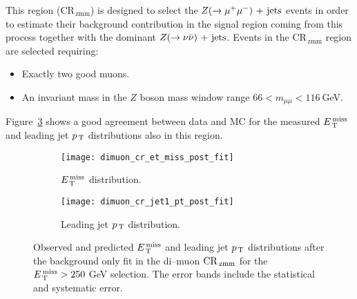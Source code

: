 This region (CR$_\mathrm{\, zmm}$) is designed to select the $Z (\rightarrow \mu^+ \mu^-)\mathrm{~+~jets}$
events in order to estimate their background contribution in the signal region
coming from this process together with the dominant $Z (\rightarrow \nu \bar{\nu})\mathrm{~+~jets}$. Events in
the CR$_\mathrm{\, zmm}$ region are selected requiring:
\begin{itemize}
\item Exactly two good muons.
\item An invariant mass in the $Z$ boson mass window range
  $66 < m_{\mu \mu} < 116~$GeV.
\end{itemize}
Figure~\ref{fig:dimuon_cr_plots} shows a good agreement between data and MC for
the measured $E_\mathrm{\, T}^\mathrm{\, miss}$ and leading jet $p_\mathrm{\, T}$ distributions also in this region.
\begin{figure}[!h]
  \centering
  \begin{subfigure}[t]{.48\linewidth}
    \texttt{[image: dimuon\_cr\_et\_miss\_post\_fit]}
    \caption{$E_\mathrm{\, T}^\mathrm{\, miss}$ distribution.}
    \label{fig:dimuon_cr_et_miss_pre_fit}
  \end{subfigure}
  \begin{subfigure}[t]{.48\linewidth}
    \texttt{[image: dimuon\_cr\_jet1\_pt\_post\_fit]}
    \caption{Leading jet $p_\mathrm{\, T}$ distribution.}
    \label{fig:dimuon_cr_jet1_pt_pre_fit}
  \end{subfigure}
  \caption{Observed and predicted $E_\mathrm{\, T}^\mathrm{\, miss}$ and leading jet $p_\mathrm{\, T}$ distributions
    after the background only fit in the di--muon $\mathrm{CR}_\mathrm{\, zmm}$ for the
    $E_\mathrm{\, T}^\mathrm{\, miss} > 250~$GeV selection. The error bands include the statistical and
    systematic error.}
  \label{fig:dimuon_cr_plots}
\end{figure}
